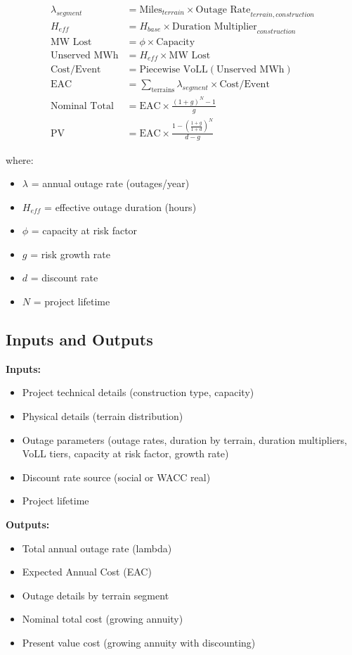 \documentclass[12pt]{article}
\begin{document}
\begin{align}
\lambda_{segment} &= \text{Miles}_{terrain} \times \text{Outage Rate}_{terrain,construction} \\
H_{eff} &= H_{base} \times \text{Duration Multiplier}_{construction} \\
\text{MW Lost} &= \phi \times \text{Capacity} \\
\text{Unserved MWh} &= H_{eff} \times \text{MW Lost} \\
\text{Cost/Event} &= \text{Piecewise VoLL}(\text{Unserved MWh}) \\
\text{EAC} &= \sum_{\text{terrains}} \lambda_{segment} \times \text{Cost/Event} \\
\text{Nominal Total} &= \text{EAC} \times \frac{(1+g)^N - 1}{g} \\
\text{PV} &= \text{EAC} \times \frac{1 - \left(\frac{1+g}{1+d}\right)^N}{d - g}
\end{align}

where:
\begin{itemize}
    \item $\lambda$ = annual outage rate (outages/year)
    \item $H_{eff}$ = effective outage duration (hours)
    \item $\phi$ = capacity at risk factor
    \item $g$ = risk growth rate
    \item $d$ = discount rate
    \item $N$ = project lifetime
\end{itemize}

\subsection{Inputs and Outputs}

\textbf{Inputs:}
\begin{itemize}
    \item Project technical details (construction type, capacity)
    \item Physical details (terrain distribution)
    \item Outage parameters (outage rates, duration by terrain, duration multipliers, VoLL tiers, capacity at risk factor, growth rate)
    \item Discount rate source (social or WACC real)
    \item Project lifetime
\end{itemize}

\textbf{Outputs:}
\begin{itemize}
    \item Total annual outage rate (lambda)
    \item Expected Annual Cost (EAC)
    \item Outage details by terrain segment
    \item Nominal total cost (growing annuity)
    \item Present value cost (growing annuity with discounting)
\end{itemize}
\end{document}
